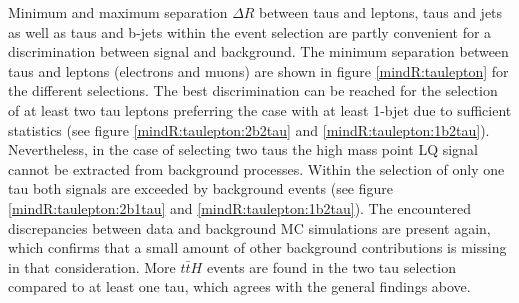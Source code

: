 %
Minimum and maximum separation $\Delta R$ between taus and leptons, taus and jets as well as taus and b-jets within the event selection are partly convenient for a discrimination between signal and background.\newline
The minimum separation between taus and leptons (electrons and muons) are shown in figure \ref{mindR:taulepton} for the different selections. The best discrimination can be reached for the selection of at least two tau leptons preferring the case with at least 1-bjet due to sufficient statistics (see figure \ref{mindR:taulepton:2b2tau} and \ref{mindR:taulepton:1b2tau}). Nevertheless, in the case of selecting two taus the high mass point LQ signal cannot be extracted from background processes. Within the selection of only one tau both signals are exceeded by background events (see figure \ref{mindR:taulepton:2b1tau} and \ref{mindR:taulepton:1b2tau}). The encountered discrepancies between data and background MC simulations are present again, which confirms that a small amount of other background contributions is missing in that consideration. More $t\bar{t}H$ events are found in the two tau selection compared to at least one tau, which agrees with the general findings above. \par
%
